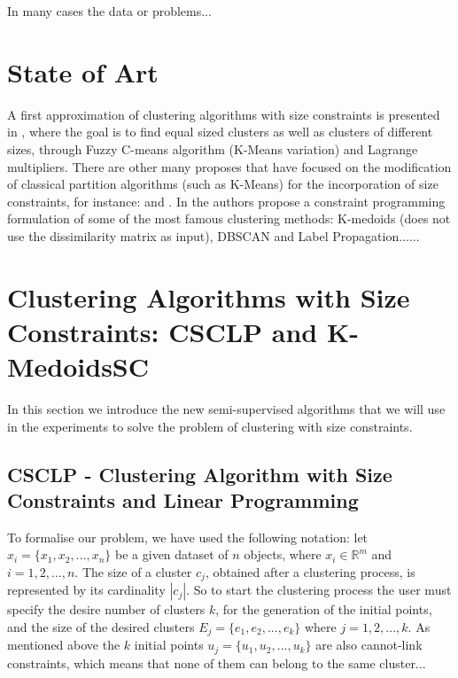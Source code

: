 \documentclass[procedia]{easychair}
\begin{document}
In many cases the data or problems...
\section{State of Art}
\label{sect:stateofart}

A first approximation of clustering algorithms with size constraints is presented in \cite{Hopner:2008}, where the goal is to find equal sized clusters as well as clusters of different sizes, through Fuzzy C-means algorithm (K-Means variation) and Lagrange
multipliers. There are other many proposes that have focused on the modification of classical partition algorithms (such as K-Means) for the incorporation of size constraints, for instance: \cite{Rebollo:2013} and \cite{Ganganath:2014}. In \cite{Grossi:2015}  the authors propose a constraint programming formulation of some of the most famous clustering methods: K-medoids (does not use the dissimilarity matrix as input), DBSCAN and Label Propagation......


\section{Clustering Algorithms with Size Constraints: CSCLP and K-MedoidsSC}
\label{sect:algorithms}
In this section we introduce the new semi-supervised algorithms that we will use in the experiments to solve the problem of clustering with size constraints.


\subsection{CSCLP - Clustering Algorithm with Size Constraints and Linear Programming}
\label{sect:csclp}
To formalise our problem, we have used the following notation: let $x_{i}=\lbrace x_{1},x_{2},...,x_{n}\rbrace$ be a given dataset of $n$ objects, where $x_{i} \in \mathbb{R}^{m}$ and $i=1,2,...,n$. The size of a cluster $c_{j}$, obtained after a clustering process, is represented by its cardinality $|c_{j}|$. So to start the clustering process the user must specify the desire number of clusters $k$, for the generation of the initial points, and the size of the desired clusters $E_{j}=\lbrace e_{1},e_{2},...,e_{k}\rbrace$ where $j=1,2,...,k$. As mentioned above the $k$ initial points $u_{j}=\lbrace u_{1},u_{2},...,u_{k}\rbrace$ are also cannot-link constraints, which means that none of them can belong to the same cluster...
\end{document}
